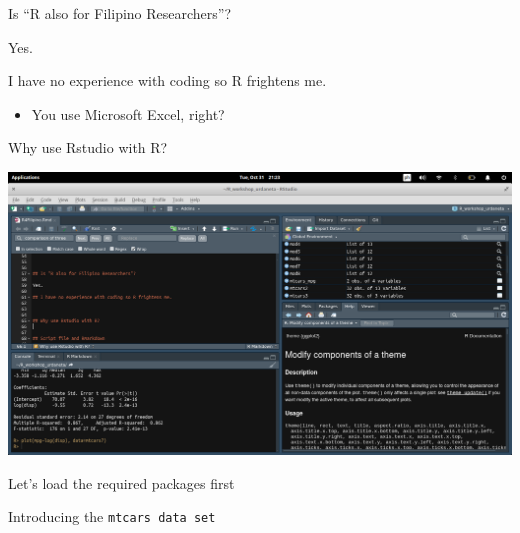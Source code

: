 \begin{frame}{Is ``R also for Filipino Researchers''?}

Yes.

\end{frame}

\begin{frame}{I have no experience with coding so R frightens me.}

\begin{itemize}
\tightlist
\item
  You use Microsoft Excel, right?
\end{itemize}

\end{frame}

\begin{frame}{Why use Rstudio with R?}

\begin{center}\includegraphics[width=900]{./img/Rmarkdown} \end{center}

\end{frame}

\begin{frame}[fragile]{Let's load the required packages first}

\begin{Shaded}
\begin{Highlighting}[]
\end{Highlighting}
\end{Shaded}

\end{frame}

\begin{frame}[fragile]{Introducing the \texttt{mtcars\ data\ set}}

\begin{Shaded}
\begin{Highlighting}[]
\NormalTok{)}
\end{Highlighting}
\end{Shaded}

\end{frame}

